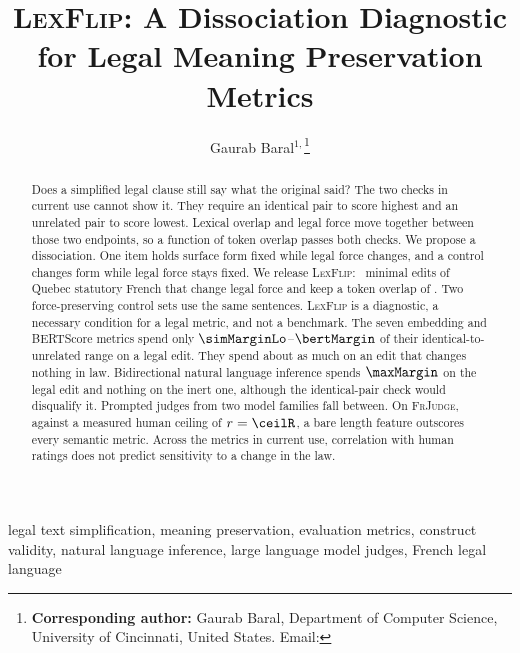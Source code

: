 \documentclass{BVP_JCLLT}
\newcommand{\rev}[1]{#1}
\newcommand{\rev}[1]{{\color{revcol}#1}}
\begin{document}

\title{\textsc{LexFlip}: A Dissociation Diagnostic for Legal Meaning Preservation Metrics}

\author{Gaurab Baral$^{1,}$\thanks{\textbf{Corresponding author:} Gaurab Baral, Department of Computer Science, University of Cincinnati, United States. Email: }}


\begin{abstract}
\rev{Does a simplified legal clause still say what the original said? The two
checks in current use cannot show it. They require an identical pair to score
highest and an unrelated pair to score lowest. Lexical overlap and legal force
move together between those two endpoints, so a function of token overlap
passes both checks. We propose a dissociation. One item holds surface form fixed
while legal force changes, and a control changes form while legal force stays
fixed. We release \textsc{LexFlip}: \numedits\ minimal edits of Quebec
statutory French that change legal force and keep a token overlap of
\meanjaccard. Two force-preserving control sets use the same sentences.
\textsc{LexFlip} is a diagnostic, a necessary condition for a legal metric, and
not a benchmark. The seven embedding and BERTScore metrics spend only
$\simMarginLo$--$\bertMargin$ of their identical-to-unrelated range on a legal
edit. They spend about as much on an edit that changes nothing in law. Bidirectional
natural language inference spends $\maxMargin$ on the legal edit and nothing on
the inert one, although the identical-pair check would disqualify it. Prompted
judges from two model families fall between. On \textsc{FrJudge}, against a
measured human ceiling of $r=\ceilR$, a bare length feature outscores every
semantic metric. Across the metrics in current use, correlation with human
ratings does not predict sensitivity to a change in the law.}
\end{abstract}

\begin{keywords}
legal text simplification, meaning preservation, evaluation metrics, construct
validity, natural language inference, large language model judges, French legal
language
\end{keywords}

\maketitle
\end{document}
